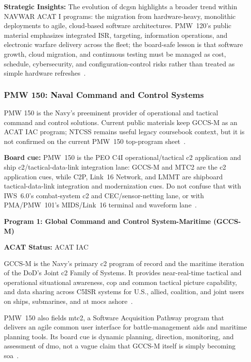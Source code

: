 \documentclass[../main.tex]{subfiles}
\begin{document}
\textbf{Strategic Insights:} The evolution of \ac{dcgsn} highlights a broader trend within NAVWAR ACAT I programs: the migration from hardware-heavy, monolithic deployments to agile, cloud-based software architectures. PMW~120's public material emphasizes integrated ISR, targeting, information operations, and electronic warfare delivery across the fleet; the board-safe lesson is that software growth, cloud migration, and continuous testing must be managed as cost, schedule, cybersecurity, and configuration-control risks rather than treated as simple hardware refreshes~\autocite{PEOC4I-PMW120-tearsheet-2026}.

\subsubsection{PMW 150: Naval Command and Control Systems}
\label{ssubsec:pmw150}

PMW 150 is the Navy's preeminent provider of operational and tactical command and control solutions. Current public materials keep GCCS-M as an ACAT IAC program; NTCSS remains useful legacy coursebook context, but it is not confirmed on the current PMW~150 top-program sheet~\autocite{PEOC4I-PMW150-tearsheet-2026}.

\textbf{Board cue:} PMW~150 is the PEO C4I operational/tactical \ac{c2} application and ship \ac{c2}/tactical-data-link integration lane: GCCS-M and MTC2 are the \ac{c2} application cues, while C2P, Link~16 Network, and LMMT are shipboard tactical-data-link integration and modernization cues. Do not confuse that with IWS~6.0's combat-system \ac{c2} and CEC/sensor-netting lane, or with PMA/PMW~101's MIDS/Link~16 terminal and waveform lane~\autocite{PEOC4I-PMW150-tearsheet-2026,PEOC4I-PMA-PMW101-tearsheet-2025}.

\textbf{Program 1: Global Command and Control System-Maritime (GCCS-M)}

\textbf{ACAT Status:} ACAT IAC~\autocite{PEOC4I-PMW150-tearsheet-2026}

GCCS-M is the Navy's primary \ac{c2} program of record and the maritime iteration of the DoD's Joint \ac{c2} Family of Systems. It provides near-real-time tactical and operational situational awareness, \ac{cop} and common tactical picture capability, and data sharing across C5ISR systems for U.S., allied, coalition, and joint users on ships, submarines, and at \acp{moc} ashore~\autocite{PEOC4I-PMW150-tearsheet-2026}.

PMW~150 also fields \ac{mtc2}, a Software Acquisition Pathway program that delivers an agile common user interface for battle-management aids and maritime planning tools. Its board cue is dynamic planning, direction, monitoring, and assessment of \ac{dmo}, not a vague claim that GCCS-M itself is simply becoming \ac{soa}~\autocite{PEOC4I-PMW150-tearsheet-2026}.
\end{document}
